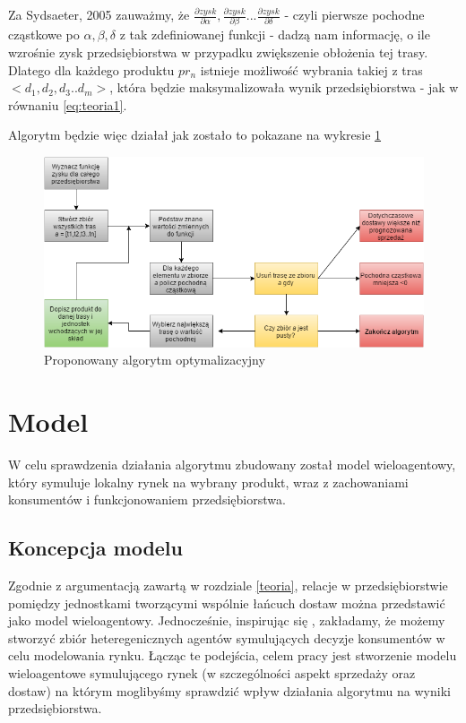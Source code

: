 \documentclass[polish, twoside, 12pt, a4paper]{article}
\theoremstyle{definition}
\theoremstyle{plain}
\theoremstyle{remark}
\begin{document}
Za Sydsaeter, 2005 zauważmy, że $\frac{\partial zysk}{\partial \alpha} , \frac{\partial zysk}{\partial \beta} ... \frac{\partial zysk}{\partial \delta}$ - czyli pierwsze pochodne cząstkowe po $\alpha,\beta,\delta$ z tak zdefiniowanej funkcji - dadzą nam informację, o ile wzrośnie zysk przedsiębiorstwa w przypadku zwiększenie obłożenia tej trasy. Dlatego dla każdego produktu $pr_n$ istnieje możliwość wybrania takiej z tras $<d_1,d_2,d_3..d_m>$, która będzie maksymalizowała wynik przedsiębiorstwa - jak w równaniu \ref{eq:teoria1}. 

Algorytm będzie więc działał jak zostało to pokazane na wykresie \ref{fig:diagramoptymalizacyny}

\begin{figure}
  \centering
\includegraphics[width=\linewidth]{pictures/diagramoptymalizacyny.png}
  \caption{Proponowany algorytm optymalizacyjny}
  \label{fig:diagramoptymalizacyny}

\end{figure}

\clearpage

\section{Model}

W celu sprawdzenia działania algorytmu zbudowany został model wieloagentowy, który symuluje lokalny rynek na wybrany produkt, wraz z zachowaniami konsumentów i funkcjonowaniem przedsiębiorstwa.

\subsection{Koncepcja modelu}

Zgodnie z argumentacją zawartą w rozdziale \ref{teoria}, relacje w przedsiębiorstwie pomiędzy jednostkami tworzącymi wspólnie łańcuch dostaw można przedstawić jako model wieloagentowy. Jednocześnie, inspirując się \cite{Kaminski2012}, zakładamy, że możemy stworzyć zbiór heteregenicznych agentów symulujących decyzje konsumentów w celu modelowania rynku. Łącząc te podejścia, celem pracy jest stworzenie modelu wieloagentowe symulującego rynek (w szczególności aspekt sprzedaży oraz dostaw) na którym moglibyśmy sprawdzić wpływ działania algorytmu na wyniki przedsiębiorstwa.
\end{document}
